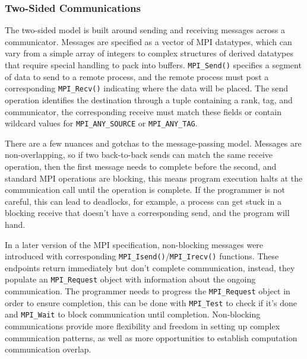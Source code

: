 \subsubsection{Two-Sided Communications}

The two-sided model is built around sending and receiving messages across a communicator.
Messages are specified as a vector of MPI datatypes, which can vary from a simple array of integers to complex structures of derived datatypes that require special handling to pack into buffers. 
\texttt{MPI\_Send()} specifies a segment of data to send to a remote process, and the remote process must post a corresponding \texttt{MPI\_Recv()} indicating where the data will be placed. 
The send operation identifies the destination through a tuple containing a rank, tag, and communicator, the corresponding receive must match these fields or contain wildcard values for \texttt{MPI\_ANY\_SOURCE} or \texttt{MPI\_ANY\_TAG}.

There are a few nuances and gotchas to the message-passing model.
Messages are non-overlapping, so if two back-to-back sends can match the same receive operation, then the first message needs to complete before the second, and standard MPI operations are blocking, this means program execution halts at the communication call until the operation is complete.
If the programmer is not careful, this can lead to deadlocks, for example, a process can get stuck in a blocking receive that doesn't have a corresponding send, and the program will hand.

In a later version of the MPI specification, non-blocking messages were introduced with corresponding \texttt{MPI\_Isend()}/\texttt{MPI\_Irecv()} functions.
These endpoints return immediately but don't complete communication, instead, they populate an \texttt{MPI\_Request} object with information about the ongoing communication.
The programmer needs to progress the \texttt{MPI\_Request} object in order to ensure completion, this can be done with \texttt{MPI\_Test} to check if it's done and \texttt{MPI\_Wait} to block communication until completion.
Non-blocking communications provide more flexibility and freedom in setting up complex communication patterns, as well as more opportunities to establish computation communication overlap.

